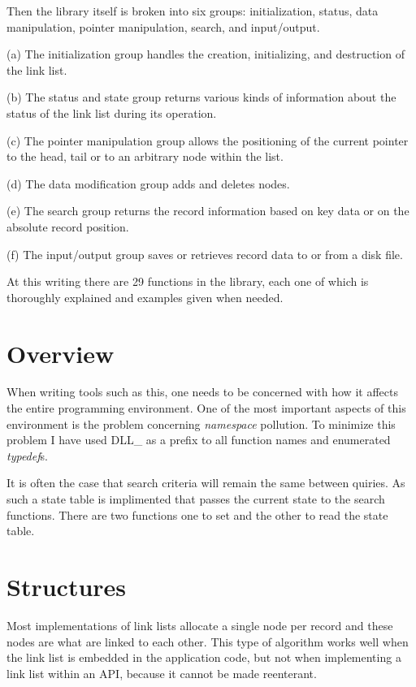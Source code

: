 \documentclass[10pt,letterpaper]{report}
\newenvironment{lquote}{\begin{list}{}{}\item[]}{\end{list}}
\begin{document}
\noindent
Then the library itself is broken into six groups: initialization, status, data manipulation, pointer manipulation, search, and input/output.

\begin{lquote}
(a) The initialization group handles the creation, initializing, and destruction of the link list.

(b) The status and state group returns various kinds of information about the status of the link list during its operation.

(c) The pointer manipulation group allows the positioning of the current pointer to the head, tail or to an arbitrary node within the list.

(d) The data modification group adds and deletes nodes.

(e) The search group returns the record information based on key data or on the absolute record position.

(f) The input/output group saves or retrieves record data to or from a disk file.
\end{lquote}

\noindent
At this writing there are 29 functions in the library, each one of which is thoroughly explained and examples given when needed.

\chapter*{Overview}
When writing tools such as this, one needs to be concerned with how it affects the entire programming environment.  One of the most important aspects of this environment is the problem concerning \emph{namespace} pollution.  To minimize this problem I have used DLL\_ as a prefix to all function names and enumerated \emph{typedef}s.
\vspace{8pt}

\noindent
It is often the case that search criteria will remain the same between quiries.  As such a state table is implimented that passes the current state to the search functions.  There are two functions one to set and the other to read the state table.







\chapter*{Structures}
Most implementations of link lists allocate a single node per record and these nodes are what are linked to each other.  This type of algorithm works well when the link list is embedded in the application code, but not when implementing a link list within an API, because it cannot be made reenterant.
\vspace{8pt}
\end{document}
